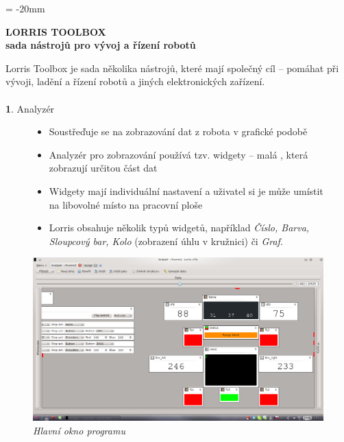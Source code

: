 \documentclass[17pt]{extreport}
\newcommand{\B}{\textbf} %
\newcommand{\It}{\textit}  %
\begin{document}

\pagestyle{empty} %

\voffset = -20mm %
\enlargethispage{100mm} %

\begin{center}
    \Large \B{LORRIS TOOLBOX \\ sada nástrojů pro vývoj a řízení robotů}
\end{center}
\vspace{5mm}
\setlength{\footskip}{0pt}
\setlength{\textheight}{750pt}
Lorris Toolbox je sada několika nástrojů, které mají společný cíl -- pomáhat při vývoji, ladění a řízení robotů a jiných elektronických zařízení.\\ \\
{\large \B 1. Analyzér }
\begin{figure}[ht]
    \begin{minipage}[t]{0.48\linewidth}
    \begin{itemize} 
        \item Soustřeďuje se na zobrazování dat z robota v grafické podobě
        \item Analyzér pro zobrazování používá tzv. widgety -- malá , která zobrazují určitou část dat
        \item Widgety mají individuální nastavení a uživatel si je může umístit na libovolné místo na pracovní ploše
        \item Lorris obsahuje několik typů widgetů, například \It{ Číslo, Barva, Sloupcový bar, Kolo} (zobrazení úhlu v kružnici) či \It{Graf}.
    \end{itemize}
    \end{minipage}
    \hfill
    \begin{minipage}[t]{0.50\linewidth}
        \vspace{0pt}
        \includegraphics[width=\linewidth]{img/screen.png}
        \centering \It{Hlavní okno programu}
    \end{minipage}
\end{figure}
\end{document}
